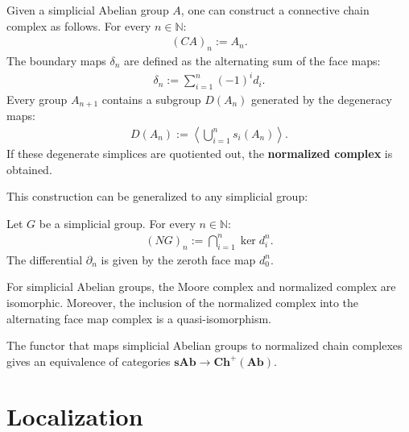     \begin{construct}
        Given a simplicial Abelian group $A$, one can construct a connective chain complex as follows. For every $n\in\mathbb{N}$:
        \begin{gather}
            (CA)_n := A_n.
        \end{gather}
        The boundary maps $\delta_n$ are defined as the alternating sum of the face maps:
        \begin{gather}
            \delta_n := \sum_{i=1}^n(-1)^id_i.
        \end{gather}
        Every group $A_{n+1}$ contains a subgroup $D(A_n)$ generated by the degeneracy maps:
        \begin{gather}
            D(A_n) := \left\langle\bigcup_{i=1}^ns_i(A_n)\right\rangle.
        \end{gather}
        If these degenerate simplices are quotiented out, the \textbf{normalized complex} is obtained.
    \end{construct}
    This construction can be generalized to any simplicial group:
    \begin{construct}
        Let $G$ be a simplicial group. For every $n\in\mathbb{N}$:
        \begin{gather}
            (NG)_n := \bigcap_{i=1}^n\ker d^n_i.
        \end{gather}
        The differential $\partial_n$ is given by the zeroth face map $d^n_0$.
    \end{construct}
    \begin{property}[Equivalences]
        For simplicial Abelian groups, the Moore complex and normalized complex are isomorphic. Moreover, the inclusion of the normalized complex into the alternating face map complex is a quasi-isomorphism.
    \end{property}

    \begin{theorem}\label{model:dold_kan}
        The functor that maps simplicial Abelian groups to normalized chain complexes gives an equivalence of categories $\mathbf{sAb}\rightarrow\mathbf{Ch}^+(\mathbf{Ab})$.
    \end{theorem}

\section{Localization}

